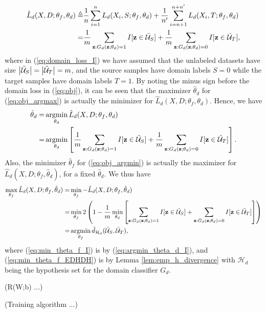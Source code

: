 \begin{align}
\hat{L}_{d}(X, D; \theta_f, \theta_d) \triangleq &
\frac{1}{n} \sum_{i=1}^{n} L_d(X_i, S; \theta_f, \theta_d)
+
\frac{1}{n'} \sum_{i=n+1}^{n + n'} L_d(X_i, T; \theta_f, \theta_d) \label{eq:domain_loss}\\
= & \frac{1}{m} \sum_{\mathbf{z}:G_d(\mathbf{z};\theta_d)=1}I[\mathbf{z} \in \tilde{\mathcal{U}}_S]+\frac{1}{m} \sum_{\mathbf{z}:G_d(\mathbf{z};\theta_d)=0}I[\mathbf{z} \in \tilde{\mathcal{U}}_T], \label{eq:domain_loss_I}
\end{align}
where in (\ref{eq:domain_loss_I}) we have assumed that the unlabeled datasets have size $\left \lvert \tilde{\mathcal{U}}_S \right \rvert=\left \lvert \tilde{\mathcal{U}}_T \right \rvert=m$, and the source samples have domain labels $S=0$ while the target samples have domain labels $T=1$. By noting the minus sign before the domain loss in (\ref{eq:obj}), it can be seen that the maximizer $\hat{\theta}_d$ for (\ref{eq:obj_argmax}) is actually the minimizer for $\hat{L}_{d}(X, D; \theta_f, \theta_d)$. Hence, we have
\begin{align}
\hat{\theta}_d
= & \mathop{\mathrm{argmin}}_{\theta_d} \hat{L}_{d}(X, D; \theta_f, \theta_d) \label{eq:argmin_theta_d}\\
= & \mathop{\mathrm{argmin}}_{\theta_d} \left[ \frac{1}{m} \sum_{\mathbf{z}:G_d(\mathbf{z};\theta_d)=1}I[\mathbf{z} \in \tilde{\mathcal{U}}_S]+\frac{1}{m} \sum_{\mathbf{z}:G_d(\mathbf{z};\theta_d)=0}I[\mathbf{z} \in \tilde{\mathcal{U}}_T] \right]. \label{eq:argmin_theta_d_I}
\end{align}
Also, the minimizer $\hat{\theta}_f$ for (\ref{eq:obj_argmin}) is actually the maximizer for $\hat{L}_{d}(X, D; \theta_f, \hat{\theta}_d)$, for a fixed $\hat{\theta}_d$. We thus have
\begin{align}
\max_{\theta_f}{\hat{L}_{d}(X, D; \theta_f, \hat{\theta}_d)}
=& \min_{\theta_f}{- \hat{L}_{d}(X, D; \theta_f, \hat{\theta}_d)} \label{eq:min_theta_f}\\
=& \min_{\theta_f} 2 \left( 1 - \frac{1}{m} \min_{\theta_d} \left[ \sum_{\mathbf{z}:G_d(\mathbf{z};\theta_d)=1}I[\mathbf{z} \in \tilde{\mathcal{U}}_S]+ \sum_{\mathbf{z}:G_d(\mathbf{z};\theta_d)=0}I[\mathbf{z} \in \tilde{\mathcal{U}}_T] \right] \right) \label{eq:min_theta_f_I}\\
=& \mathop{\mathrm{argmin}}_{\theta_f} \hat{d}_{\mathcal{H}_d}(\tilde{\mathcal{U}}_S, \tilde{\mathcal{U}}_T) \label{eq:min_theta_f_EDHDH},
\end{align}
where (\ref{eq:min_theta_f_I}) is by (\ref{eq:argmin_theta_d_I}), and (\ref{eq:min_theta_f_EDHDH}) is by Lemma \ref{lem:emp_h_divergence} with $\mathcal{H}_d$ being the hypothesis set for the domain classifier $G_d$.

(R(W;b) ...)

(Training algorithm ...)

